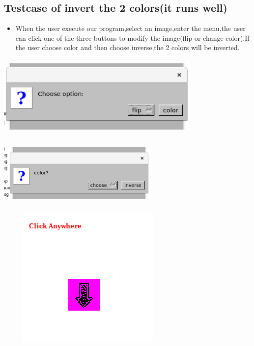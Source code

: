 \documentclass{article}
\begin{document}
\subsection*{Testcase of invert the 2 colors(it runs well)}
\begin{itemize}
	\item When the user execute our program,select an image,enter the menu,the user can click one of the three buttons to modify the image(flip or change color).If the user choose color and then choose inverse,the 2 colors will be inverted.
\end{itemize}
\includegraphics[width = 10cm, height = 4cm]{i1.png}
\includegraphics[width = 8cm, height = 4cm]{i2.png}
\includegraphics[width = 9cm, height = 7cm]{i3.png}
\end{document}
